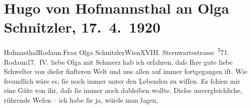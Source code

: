 

         
         \renewcommand{\erwaehntePersonen}{Personen: Hugo von Hofmannsthal, Olga Schnitzler, Elisabeth Steinrück}
         \renewcommand{\erwaehnteOrte}{Orte: Rodaun, Sternwartestraße, Wien}
         \renewcommand{\erwaehnteWerke}{}
               \section[Hugo von Hofmannsthal an Olga Schnitzler, 17. 4. 1920]{ Hugo von Hofmannsthal an Olga Schnitzler, 17. 4. 1920}\nopagebreak{}\rehead{ }\begin{ledgroupsized}[t]{13cm}\normalsize\beginnumbering{} \toendnotes[C]{\smallbreak\pagebreak[2]} 
\toendnotes[C]{\smallbreak}\pstart{}{\pb}Hofma{\geminationn}sthal\pend{}\pstart{}Rodaun.\pend{}{\bigskip}\pstart{}Frau Olga Schnitzler\pend{}\pstart{}Wien\pend{}\pstart{}XVIII. Sternwartestrasse \substVorne{}\textsuperscript{5}\substDazwischen{}7\substHinten{}1.\pend{}{\bigskip}\pstart
           \raggedleft{}{\pb}Rodaun17. IV.\pend
           \pstart{}liebe Olga\pend\pstart
           mit Schmerz hab ich erfahren, daſs Ihre gute liebe Schweſter von dieſer finſteren Welt und uns allen auf immer
               fortgegangen iſt. Wie freundlich wäre es, ſie noch immer unter den Lebenden zu
               wiſſen. Es ſchien mir eine Güte von ihr, daſs ſie immer noch dableiben wollte. Dieſes
               unvergleichliche, rührende Weſen – ich habe ſie ja, {\pb}würde man ſagen,

\end{ledgroupsized}
